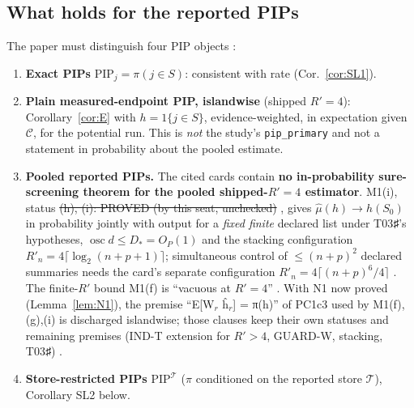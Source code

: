 \subsection{What holds for the reported PIPs}\label{sec:pips}
The paper must distinguish four PIP objects :
\begin{enumerate}
\item \textbf{Exact PIPs} $\mathrm{PIP}_j=\pi(j\in S)$: consistent with rate (Cor.~\ref{cor:SL1}).
\item \textbf{Plain measured-endpoint PIP, islandwise} (shipped $R'=4$): Corollary~\ref{cor:E} with $h=1\{j\in S\}$, evidence-weighted, in expectation given $\mathcal C$, for the potential run. This is \emph{not} the study's \texttt{pip\_primary} and not a statement in probability about the pooled estimate.
\item \textbf{Pooled reported PIPs.} The cited cards contain \textbf{no in-probability sure-screening theorem for the pooled shipped-$R'=4$ estimator}. M1(i), status \st{(h), (i): PROVED (by this seat, unchecked)} , gives $\hat{\mu}(h)\to h(S_0)$ in probability jointly with output for a \emph{fixed finite} declared list under T03♯'s hypotheses, $\operatorname{osc}d\le D_*=O_P(1)$ and the stacking configuration $R'_n=4\lceil\log_2(n+p+1)\rceil$; simultaneous control of $\le(n+p)^2$ declared summaries needs the card's separate configuration $R'_n=4\lceil(n+p)^6/4\rceil$ . The finite-$R'$ bound M1(f) is ``vacuous at $R'=4$'' . With N1 now proved (Lemma~\ref{lem:N1}), the premise ``E[W$_r$ ĥ$_r$] = π(h)'' of PC1c3 used by M1(f),(g),(i) is discharged islandwise; those clauses keep their own statuses and remaining premises (IND-T extension for $R'>4$, GUARD-W, stacking, T03♯) .
\item \textbf{Store-restricted PIPs} $\mathrm{PIP}^{\mathcal T}$ ($\pi$ conditioned on the reported store $\mathcal T$), Corollary SL2 below.
\end{enumerate}

